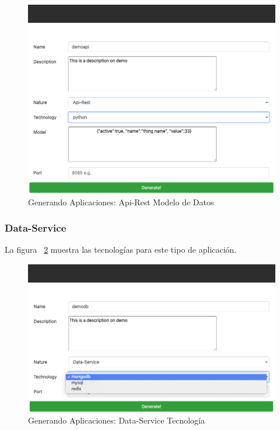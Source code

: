 \documentclass[a4paper,11pt]{book}
\begin{document}
\begin{figure}[H]
\centering
\includegraphics[scale=0.4]{imagenes/casouso_a/19.png}
\caption{  Generando Aplicaciones: Api-Rest Modelo de Datos  }
\label{19}
\end{figure}

\subsubsection{Data-Service}

La figura ~\ref{20} muestra las tecnologías para este tipo de aplicación. 

\begin{figure}[H]
\centering
\includegraphics[scale=0.4]{imagenes/casouso_a/20.png}
\caption{  Generando Aplicaciones: Data-Service Tecnología  }
\label{20}
\end{figure}
\end{document}

